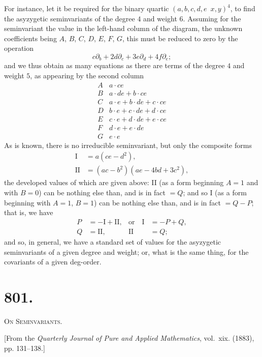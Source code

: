 \documentclass[11pt,a4paper]{article}
\theoremstyle{definition}
\theoremstyle{remark}
\begin{document}
For instance, let it be required for the binary quartic $(a, b, c, d, e \!\!\!\! \,\,\, x, y)^4$, to find the asyzygetic seminvariants of the degree $4$ and weight $6$. Assuming for the seminvariant the value in the left-hand column of the diagram, the unknown coefficients being $A$, $B$, $C$, $D$, $E$, $F$, $G$, this must be reduced to zero by the operation
\[
c\partial_b + 2d\partial_c + 3e\partial_d + 4f\partial_e;
\]
and we thus obtain as many equations as there are terms of the degree $4$ and weight $5$, as appearing by the second column
\[
\begin{array}{r|l}
A & a \cdot ce \\
B & a \cdot de + b \cdot ce \\
C & a \cdot e + b \cdot de + c \cdot ce \\
D & b \cdot e + c \cdot de + d \cdot ce \\
E & c \cdot e + d \cdot de + e \cdot ce \\
F & d \cdot e + e \cdot de \\
G & e \cdot e
\end{array}
\]
As is known, there is no irreducible seminvariant, but only the composite forms
\[
\begin{aligned}
\text{I} &= a(ce - d^2), \\
\text{II} &= (ac - b^2)(ae - 4bd + 3c^2),
\end{aligned}
\]
the developed values of which are given above: II (as a form beginning $A=1$ and with $B=0$) can be nothing else than, and is in fact $=Q$; and so I (as a form beginning with $A=1$, $B=1$) can be nothing else than, and is in fact $=Q-P$; that is, we have
\[
\begin{aligned}
P &= -\text{I} + \text{II}, & \text{or} \quad \text{I} &= -P + Q, \\
Q &= \text{II}, & \text{II} &= Q;
\end{aligned}
\]
and so, in general, we have a standard set of values for the asyzygetic seminvariants of a given degree and weight; or, what is the same thing, for the covariants of a given deg-order.



\newpage
\section*{801.}
\begin{center}
{\large\scshape On Seminvariants.}
\end{center}

\begin{flushright}
\small[From the \textit{Quarterly Journal of Pure and Applied Mathematics}, vol.~xix. (1883),\\
pp. 131--138.]
\end{flushright}
\end{document}
